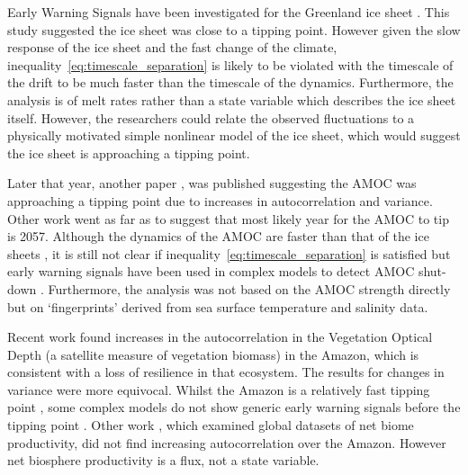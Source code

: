 Early Warning Signals have been investigated for the Greenland ice sheet \parencite{Boers2021}. This study suggested the ice sheet was close to a tipping point.
However given the slow response of the ice sheet and
the fast change of the climate, inequality~\ref{eq:timescale_separation} is likely to be violated with the timescale of the drift to be much faster than the timescale of the dynamics.
Furthermore, the analysis is of melt rates
rather than a state variable which describes the ice sheet itself. However, the researchers could relate the observed fluctuations to a physically motivated simple nonlinear model of the ice sheet,
which would suggest the ice sheet is approaching a tipping point.

Later that year, another paper \parencite{Boers2021a}, was published suggesting the AMOC was approaching a tipping point due to increases in autocorrelation and variance.
Other work \parencite{Ditlevsen2023} went as far
as to suggest that most likely year for the AMOC to tip is 2057. Although the dynamics of the AMOC are faster than that of the ice sheets \parencite{ArmstrongMcKay2022}, it is still not clear if
inequality~\ref{eq:timescale_separation} is satisfied but early warning signals have been used in complex models to detect AMOC shut-down \parencite{Boulton2014}.
Furthermore, the analysis was not based on the AMOC strength directly but on `fingerprints' derived from sea surface temperature and salinity data.

Recent work \parencite{Boulton2022} found increases in the autocorrelation in  the Vegetation Optical Depth (a satellite measure of vegetation biomass) in the Amazon,
which is consistent with a loss of resilience in that
ecosystem. The results for changes in variance were more equivocal. Whilst the Amazon is a relatively fast tipping point \parencite{Ritchie2021}, some complex models do not show
generic early warning signals before the
tipping point \parencite{Boulton2013}. Other work \parencite{Fernandez-Martinez2023}, which examined global datasets of net biome productivity, did not find increasing autocorrelation
over the Amazon. However net biosphere productivity is a flux, not a state variable.